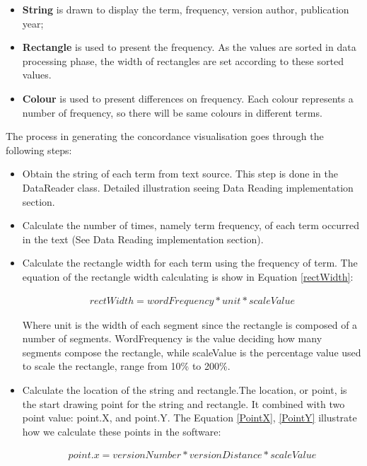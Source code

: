 \begin{itemize}
	\item \textbf{String} is drawn to display the term, frequency, version author, publication year; 
	\item \textbf{Rectangle} is used to present the frequency. As the values are sorted in data processing phase, the width of rectangles are set according to these sorted values.
	\item \textbf{Colour} is used to present differences on frequency. Each colour represents a number of frequency, so there will be same colours in different terms.
\end{itemize}

The process in generating the concordance visualisation goes through the following steps:
\begin{itemize}
	\item \textbf{} Obtain the string of each term from text source. This step is done in the DataReader class. Detailed illustration seeing Data Reading implementation section.
	\item \textbf{} Calculate the number of times, namely term frequency, of each term occurred in the text (See Data Reading implementation section).  	
	\item \textbf{} Calculate the rectangle width for each term using the frequency of term. The equation of the rectangle width calculating is show in Equation \eqref{rectWidth}:
	
	\begin{multline}\label{rectWidth}
	rectWidth=wordFrequency*unit*scaleValue
	\end{multline}
	
	Where unit is the width of each segment since the rectangle is composed of a number of segments. WordFrequency is the value deciding how many segments compose the rectangle, while scaleValue is the percentage value used to scale the rectangle, range from 10\% to 200\%.
	
	\item \textbf{}Calculate the location of the string and rectangle.The location, or point, is the start drawing point for the string and rectangle. It combined with two point value: point.X, and point.Y. The Equation \eqref{PointX}, \eqref{PointY} illustrate how we calculate these points in the software:
	
	\begin{multline}\label{PointX}
	point.x=versionNumber*versionDistance*scaleValue
	\end{multline}
	

\end{itemize}
